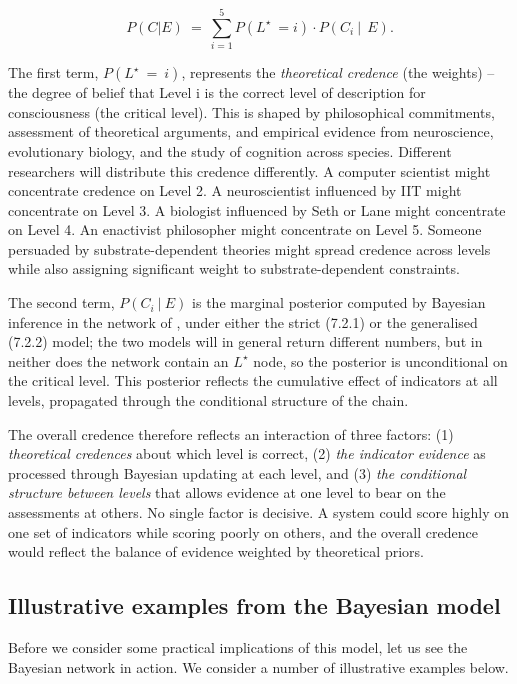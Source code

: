\documentclass[11pt, a4paper, onecolumn, gdm]{google}
\begin{document}
\[
P(C|E)\  = \ \sum_{i = 1}^{5}P(L^{\star}\  = i) \cdot P(C_{i}\ |\ \ E).
\]

The first term, \(P(L^{\star}\  = \ i)\), represents the \emph{theoretical credence} (the weights) -- the degree of belief that Level i is the correct level of description for consciousness (the critical level).
This is shaped by philosophical commitments, assessment of theoretical arguments, and empirical evidence from neuroscience, evolutionary biology, and the study of cognition across species.
Different researchers will distribute this credence differently.
A computer scientist might concentrate credence on Level 2.
A neuroscientist influenced by IIT might concentrate on Level 3.
A biologist influenced by Seth or Lane might concentrate on Level 4.
An enactivist philosopher might concentrate on Level 5.
Someone persuaded by substrate-dependent theories might spread credence across levels while also assigning significant weight to substrate-dependent constraints.

The second term, \(P(C_{i}\ |\ E)\) is the marginal posterior computed by Bayesian inference in the network of , under either the strict (7.2.1) or the generalised (7.2.2) model; the two models will in general return different numbers, but in neither does the network contain an \(L^{\star}\) node, so the posterior is unconditional on the critical level.
This posterior reflects the cumulative effect of indicators at all levels, propagated through the conditional structure of the chain.

The overall credence therefore reflects an interaction of three factors: (1) \emph{theoretical credences} about which level is correct, (2) \emph{the indicator evidence} as processed through Bayesian updating at each level, and (3) \emph{the conditional structure between levels} that allows evidence at one level to bear on the assessments at others.
No single factor is decisive.
A system could score highly on one set of indicators while scoring poorly on others, and the overall credence would reflect the balance of evidence weighted by theoretical priors.

\subsection{Illustrative examples from the Bayesian model}\label{illustrative-examples-from-the-bayesian-model}

Before we consider some practical implications of this model, let us see the Bayesian network in action.
We consider a number of illustrative examples below.
\end{document}
